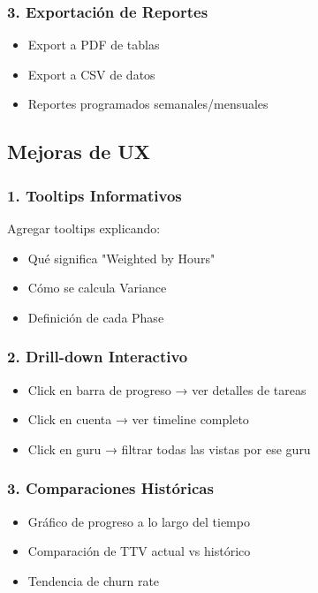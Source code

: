 \documentclass[12pt,a4paper]{article}
\begin{document}
\subsubsection{3. Exportación de Reportes}
\begin{itemize}
    \item Export a PDF de tablas
    \item Export a CSV de datos
    \item Reportes programados semanales/mensuales
\end{itemize}

\subsection{Mejoras de UX}

\subsubsection{1. Tooltips Informativos}
Agregar tooltips explicando:
\begin{itemize}
    \item Qué significa "Weighted by Hours"
    \item Cómo se calcula Variance
    \item Definición de cada Phase
\end{itemize}

\subsubsection{2. Drill-down Interactivo}
\begin{itemize}
    \item Click en barra de progreso → ver detalles de tareas
    \item Click en cuenta → ver timeline completo
    \item Click en guru → filtrar todas las vistas por ese guru
\end{itemize}

\subsubsection{3. Comparaciones Históricas}
\begin{itemize}
    \item Gráfico de progreso a lo largo del tiempo
    \item Comparación de TTV actual vs histórico
    \item Tendencia de churn rate
\end{itemize}
\end{document}
